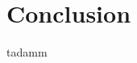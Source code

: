 \section{Conclusion}

\begin{frame}
\tableofcontents[currentsection]
\end{frame}
\begin{frame}
tadamm
\end{frame}